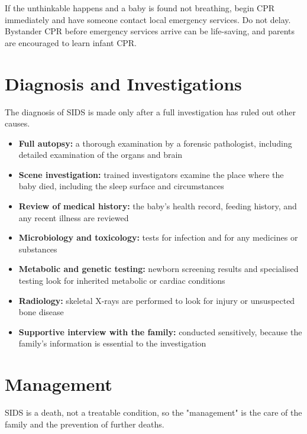 If the unthinkable happens and a baby is found not breathing, begin CPR immediately and have someone contact local emergency services. Do not delay. Bystander CPR before emergency services arrive can be life-saving, and parents are encouraged to learn infant CPR.

\section*{Diagnosis and Investigations}
The diagnosis of SIDS is made only after a full investigation has ruled out other causes.

\begin{itemize}
    \item \textbf{Full autopsy:} a thorough examination by a forensic pathologist, including detailed examination of the organs and brain
    \item \textbf{Scene investigation:} trained investigators examine the place where the baby died, including the sleep surface and circumstances
    \item \textbf{Review of medical history:} the baby's health record, feeding history, and any recent illness are reviewed
    \item \textbf{Microbiology and toxicology:} tests for infection and for any medicines or substances
    \item \textbf{Metabolic and genetic testing:} newborn screening results and specialised testing look for inherited metabolic or cardiac conditions
    \item \textbf{Radiology:} skeletal X-rays are performed to look for injury or unsuspected bone disease
    \item \textbf{Supportive interview with the family:} conducted sensitively, because the family's information is essential to the investigation
\end{itemize}

\section*{Management}
SIDS is a death, not a treatable condition, so the "management" is the care of the family and the prevention of further deaths.

